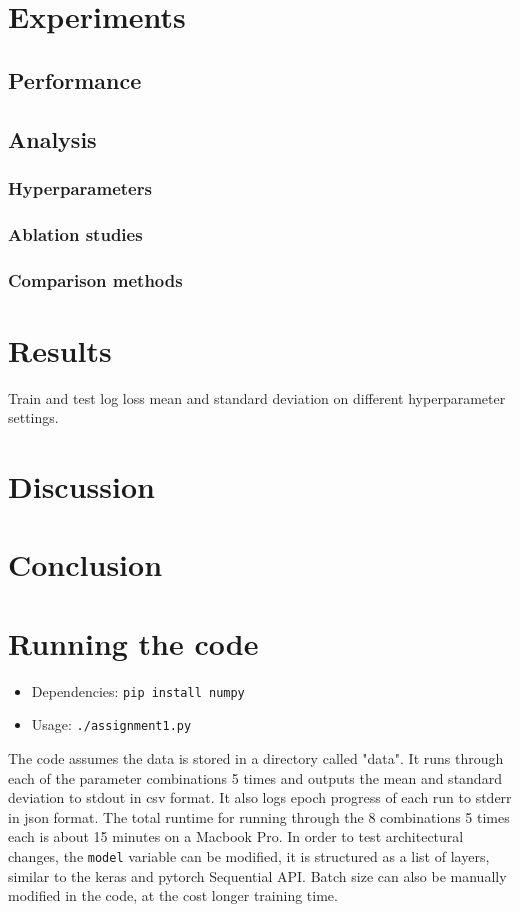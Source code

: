 \documentclass[landscape,twocolumn]{article}
\begin{document}
\section{Experiments}
\subsection{Performance}
\subsection{Analysis}
\subsubsection{Hyperparameters}
\subsubsection{Ablation studies}
\subsubsection{Comparison methods}

\section{Results}
\begin{table}\pgfplotstabletypeset[
    every head row/.style={after row=\hline},
]{\results}\caption{
  Train and test log loss mean and standard deviation on different hyperparameter settings.
  \label{tab:results}
}\end{table}

\section{Discussion}

\section{Conclusion}

\printbibliography\appendix
\section{Running the code}
\begin{itemize}
\item Dependencies: \texttt{pip install numpy}
\item Usage: \texttt{./assignment1.py}
\end{itemize}
The code assumes the data is stored in a directory called "data". It runs through each of the parameter combinations 5 times and outputs the mean and standard deviation to stdout in csv format. It also logs epoch progress of each run to stderr in json format. The total runtime for running through the 8 combinations 5 times each is about 15 minutes on a Macbook Pro. In order to test architectural changes, the \texttt{model} variable can be modified, it is structured as a list of layers, similar to the keras and pytorch Sequential API. Batch size can also be manually modified in the code, at the cost longer training time.
\end{document}
